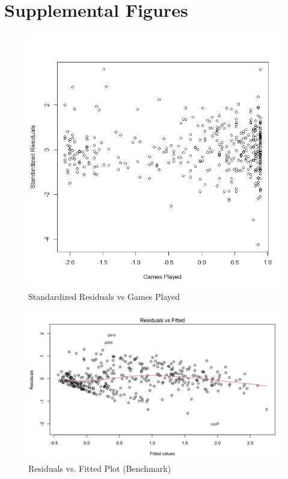 \documentclass[10pt]{article}
\begin{document}
{{{{%
\vfill\break
\section{Supplemental Figures}
\label{a:supplemental-fig}

\begin{figure}[tph]
\centering
	\includegraphics[width=0.9\columnwidth]{games_played_vs_resid_sq}
	\caption[]
    	{Standardized Residuals vs Games Played\endtabular}
	\label{advanced-games}
\end{figure}

\begin{figure}[tph]
\centering
	\includegraphics[width=0.9\columnwidth]{benchmark_residuals_vs_fitted}
	\caption[]
    	{Residuals vs. Fitted Plot (Benchmark)\endtabular}
	\label{benchmark-residuals}
\end{figure}

}}}}
\end{document}
